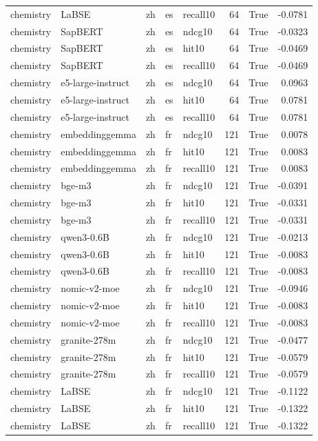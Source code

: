 \begin{tabular}{lllllrrr}
chemistry & LaBSE & zh & es & recall10 & 64 & True & -0.0781 \\
chemistry & SapBERT & zh & es & ndcg10 & 64 & True & -0.0323 \\
chemistry & SapBERT & zh & es & hit10 & 64 & True & -0.0469 \\
chemistry & SapBERT & zh & es & recall10 & 64 & True & -0.0469 \\
chemistry & e5-large-instruct & zh & es & ndcg10 & 64 & True & 0.0963 \\
chemistry & e5-large-instruct & zh & es & hit10 & 64 & True & 0.0781 \\
chemistry & e5-large-instruct & zh & es & recall10 & 64 & True & 0.0781 \\
chemistry & embeddinggemma & zh & fr & ndcg10 & 121 & True & 0.0078 \\
chemistry & embeddinggemma & zh & fr & hit10 & 121 & True & 0.0083 \\
chemistry & embeddinggemma & zh & fr & recall10 & 121 & True & 0.0083 \\
chemistry & bge-m3 & zh & fr & ndcg10 & 121 & True & -0.0391 \\
chemistry & bge-m3 & zh & fr & hit10 & 121 & True & -0.0331 \\
chemistry & bge-m3 & zh & fr & recall10 & 121 & True & -0.0331 \\
chemistry & qwen3-0.6B & zh & fr & ndcg10 & 121 & True & -0.0213 \\
chemistry & qwen3-0.6B & zh & fr & hit10 & 121 & True & -0.0083 \\
chemistry & qwen3-0.6B & zh & fr & recall10 & 121 & True & -0.0083 \\
chemistry & nomic-v2-moe & zh & fr & ndcg10 & 121 & True & -0.0946 \\
chemistry & nomic-v2-moe & zh & fr & hit10 & 121 & True & -0.0083 \\
chemistry & nomic-v2-moe & zh & fr & recall10 & 121 & True & -0.0083 \\
chemistry & granite-278m & zh & fr & ndcg10 & 121 & True & -0.0477 \\
chemistry & granite-278m & zh & fr & hit10 & 121 & True & -0.0579 \\
chemistry & granite-278m & zh & fr & recall10 & 121 & True & -0.0579 \\
chemistry & LaBSE & zh & fr & ndcg10 & 121 & True & -0.1122 \\
chemistry & LaBSE & zh & fr & hit10 & 121 & True & -0.1322 \\
chemistry & LaBSE & zh & fr & recall10 & 121 & True & -0.1322 \\

\end{tabular}
